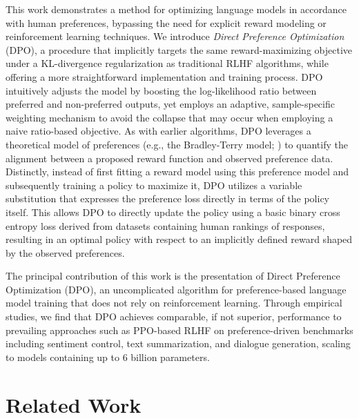 This work demonstrates a method for optimizing language models in accordance with human preferences, bypassing the need for explicit reward modeling or reinforcement learning techniques. We introduce \textit{Direct Preference Optimization} (DPO), a procedure that implicitly targets the same reward-maximizing objective under a KL-divergence regularization as traditional RLHF algorithms, while offering a more straightforward implementation and training process. DPO intuitively adjusts the model by boosting the log-likelihood ratio between preferred and non-preferred outputs, yet employs an adaptive, sample-specific weighting mechanism to avoid the collapse that may occur when employing a naive ratio-based objective. As with earlier algorithms, DPO leverages a theoretical model of preferences (e.g., the Bradley-Terry model; \cite{bradley1952rankanalysis}) to quantify the alignment between a proposed reward function and observed preference data. Distinctly, instead of first fitting a reward model using this preference model and subsequently training a policy to maximize it, DPO utilizes a variable substitution that expresses the preference loss directly in terms of the policy itself. This allows DPO to directly update the policy using a basic binary cross entropy loss derived from datasets containing human rankings of responses, resulting in an optimal policy with respect to an implicitly defined reward shaped by the observed preferences.

The principal contribution of this work is the presentation of Direct Preference Optimization (DPO), an uncomplicated algorithm for preference-based language model training that does not rely on reinforcement learning. Through empirical studies, we find that DPO achieves comparable, if not superior, performance to prevailing approaches such as PPO-based RLHF on preference-driven benchmarks including sentiment control, text summarization, and dialogue generation, scaling to models containing up to 6 billion parameters.

\section{Related Work}

